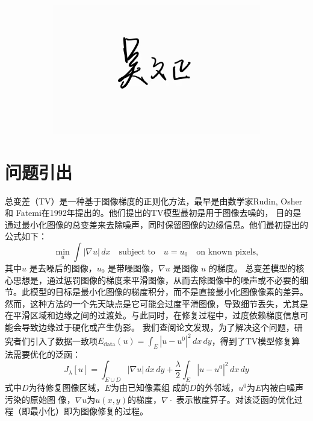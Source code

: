 \documentclass[UTF8]{ctexart}
\begin{document}
\begin{figure}[H]
\begin{subfigure}[b]{0.3\textwidth}
    \end{subfigure}
    \hfill
    \begin{subfigure}[b]{0.3\textwidth}
        \includegraphics[width=\textwidth]{wwz.png} %
    \end{subfigure}
\end{figure}
\tableofcontents
\newpage
\section{问题引出}
总变差（TV）是一种基于图像梯度的正则化方法，最早是由数学家Rudin, Osher 和 Fatemi在1992年提出的。他们提出的TV模型最初是用于图像去噪的，
目的是通过最小化图像的总变差来去除噪声，同时保留图像的边缘信息。他们最初提出的公式如下：
\[\min_u \int |\nabla u| \, dx \quad \text{subject to} \quad u = u_0 \quad \text{on known pixels},\]
其中\( u \) 是去噪后的图像，\( u_0 \) 是带噪图像，\( \nabla u \) 是图像 \( u \) 的梯度。
总变差模型的核心思想是，通过惩罚图像的梯度来平滑图像，从而去除图像中的噪声或不必要的细节。此模型的目标是最小化图像的梯度积分，而不是直接最小化图像像素的差异。
然而，这种方法的一个先天缺点是它可能会过度平滑图像，导致细节丢失，尤其是在平滑区域和边缘之间的过渡处。与此同时，在修复过程中，过度依赖梯度信息可能会导致边缘过于硬化或产生伪影。
我们查阅论文发现，为了解决这个问题，研究者们引入了数据一致项$E_{\text{data}}(u) = \int_E |u - u^0|^2 \, dx \, dy$，得到了TV模型修复算法需要优化的泛函：
\[J_{\lambda}[u] = \int_{E \cup D} |\nabla u| \, dx \, dy + \frac{\lambda}{2} \int_{E} |u - u^0|^2 \, dx \, dy\]
式中$D$为待修复图像区域，$E$为由已知像素组
成的$D$的外邻域，$u^0$为$E$内被白噪声污染的原始图
像，$\nabla u$为$u(x,y)$的梯度，$\nabla \cdot$ 表示散度算子。对该泛函的优化过程（即最小化）即为图像修复的过程。
\end{document}
